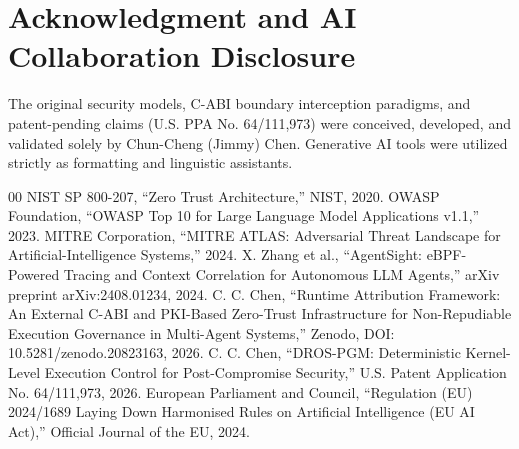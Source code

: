 \documentclass[conference]{IEEEtran}
\begin{document}
\section*{Acknowledgment and AI Collaboration Disclosure}
The original security models, C-ABI boundary interception paradigms, and patent-pending claims (U.S. PPA No. 64/111,973) were conceived, developed, and validated solely by Chun-Cheng (Jimmy) Chen. Generative AI tools were utilized strictly as formatting and linguistic assistants.

\begin{thebibliography}{00}
 NIST SP 800-207, ``Zero Trust Architecture,'' NIST, 2020.
 OWASP Foundation, ``OWASP Top 10 for Large Language Model Applications v1.1,'' 2023.
 MITRE Corporation, ``MITRE ATLAS: Adversarial Threat Landscape for Artificial-Intelligence Systems,'' 2024.
 X. Zhang et al., ``AgentSight: eBPF-Powered Tracing and Context Correlation for Autonomous LLM Agents,'' arXiv preprint arXiv:2408.01234, 2024.
 C. C. Chen, ``Runtime Attribution Framework: An External C-ABI and PKI-Based Zero-Trust Infrastructure for Non-Repudiable Execution Governance in Multi-Agent Systems,'' Zenodo, DOI: 10.5281/zenodo.20823163, 2026.
 C. C. Chen, ``DROS-PGM: Deterministic Kernel-Level Execution Control for Post-Compromise Security,'' U.S. Patent Application No. 64/111,973, 2026.
 European Parliament and Council, ``Regulation (EU) 2024/1689 Laying Down Harmonised Rules on Artificial Intelligence (EU AI Act),'' Official Journal of the EU, 2024.
\end{thebibliography}
\end{document}
